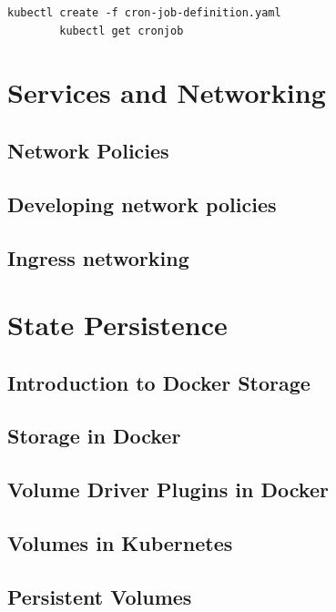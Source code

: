 \documentclass[11pt]{book}
\begin{document}
    \begin{lstlisting}[language=terminal, caption={Sumnmary of commands}]
        kubectl create -f cron-job-definition.yaml
        kubectl get cronjob
    \end{lstlisting}


    \chapter{Services and Networking}

    \section{Network Policies}

    \section{Developing network policies}

    \section{Ingress networking}

    \chapter{State Persistence}

    \section{Introduction to Docker Storage}

    \section{Storage in Docker}

    \section{Volume Driver Plugins in Docker}

    \section{Volumes in Kubernetes}

    \section{Persistent Volumes}
\end{document}
